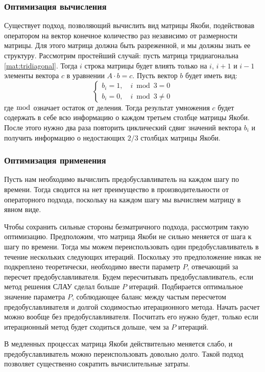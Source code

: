 \subsubsection*{Оптимизация вычисления}
Существует подход, позволяющий вычислить вид матрицы Якоби, подействовав оператором на вектор конечное количество раз независимо от размерности матрицы. Для этого матрица должна быть разреженной, и мы должны знать ее структуру. Рассмотрим простейший случай: пусть матрица тридиагональна \eqref{mat:tridiagonal}. Тогда $i$ строка матрицы будет влиять только на $i$, $i + 1$ и $i - 1$ элементы вектора $c$ в уравнении $A \cdot b = c$. Пусть вектор $b$ будет иметь вид:
\begin{equation}
\begin{cases}
b_i = 1, \quad i \bmod  3 = 0 \\
b_i = 0, \quad i \bmod  3 \neq 0
\end{cases}
\end{equation}
где $\bmod$ означает остаток от деления. Тогда результат умножения $c$ будет содержать в себе всю информацию о каждом третьем столбце матрицы Якоби. После этого нужно два раза повторить циклический сдвиг значений вектора $b_i$ и получить информацию о недостающих $2/3$ столбцах матрицы Якоби.

\subsubsection*{Оптимизация применения}
Пусть нам необходимо вычислить предобуславливатель на каждом шагу по времени. Тогда сводится на нет преимущество в производительности от операторного подхода, поскольку на каждом шагу мы вычисляем матрицу в явном виде.

Чтобы сохранить сильные стороны безматричного подхода, рассмотрим такую оптимизацию. Предположим, что матрица Якоби не сильно меняется от шага к шагу по времени. Тогда мы можем переиспользовать один предобуславливатель в течение нескольких следующих итераций. Поскольку это предположение никак не подкреплено теоретически, необходимо ввести параметр $P$, отвечающий за пересчет предобуславливателя. Будем пересчитывать предобуславливатель, если метод решения СЛАУ сделал больше $P$ итераций. Подбирается оптимальное значение параметра $P$, соблюдающее баланс между частым пересчетом предобуславливателя и долгой сходимостью итерационного метода. Начать расчет можно вообще без предобуславливателя. Посчитать его нужно будет, только если итерационный метод будет сходиться дольше, чем за $P$ итераций.
\par
В медленных процессах матрица Якоби действительно меняется слабо, и предобуславливатель можно переиспользовать довольно долго. Такой подход позволяет существенно сократить вычислительные затраты.

